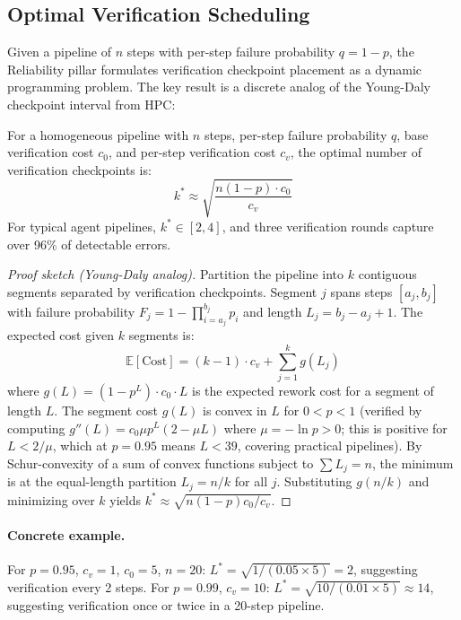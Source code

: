 \subsection{Optimal Verification Scheduling}

Given a pipeline of $n$ steps with per-step failure probability $q = 1 - p$, the Reliability pillar formulates verification checkpoint placement as a dynamic programming problem. The key result is a discrete analog of the Young-Daly checkpoint interval from HPC:

\begin{theorem}
\label{thm:checkpoint}
For a homogeneous pipeline with $n$ steps, per-step failure probability $q$, base verification cost $c_0$, and per-step verification cost $c_v$, the optimal number of verification checkpoints is:
\begin{equation}
    k^* \approx \sqrt{\frac{n(1-p) \cdot c_0}{c_v}}
\end{equation}
For typical agent pipelines, $k^* \in [2, 4]$, and three verification rounds capture over 96\% of detectable errors.
\end{theorem}

\begin{proof}[Proof sketch (Young-Daly analog)]
Partition the pipeline into $k$ contiguous segments separated by verification checkpoints. Segment $j$ spans steps $[a_j, b_j]$ with failure probability $F_j = 1 - \prod_{i=a_j}^{b_j} p_i$ and length $L_j = b_j - a_j + 1$. The expected cost given $k$ segments is:
\[
    \mathbb{E}[\text{Cost}] = (k-1) \cdot c_v + \sum_{j=1}^{k} g(L_j)
\]
where $g(L) = (1 - p^L) \cdot c_0 \cdot L$ is the expected rework cost for a segment of length $L$. The segment cost $g(L)$ is convex in $L$ for $0 < p < 1$ (verified by computing $g''(L) = c_0 \mu p^L(2 - \mu L)$ where $\mu = -\ln p > 0$; this is positive for $L < 2/\mu$, which at $p = 0.95$ means $L < 39$, covering practical pipelines). By Schur-convexity of a sum of convex functions subject to $\sum L_j = n$, the minimum is at the equal-length partition $L_j = n/k$ for all $j$. Substituting $g(n/k)$ and minimizing over $k$ yields $k^* \approx \sqrt{n(1-p)c_0/c_v}$.
\end{proof}

\paragraph{Concrete example.} For $p = 0.95$, $c_v = 1$, $c_0 = 5$, $n = 20$: $L^* = \sqrt{1/(0.05 \times 5)} = 2$, suggesting verification every 2 steps. For $p = 0.99$, $c_v = 10$: $L^* = \sqrt{10/(0.01 \times 5)} \approx 14$, suggesting verification once or twice in a 20-step pipeline.

